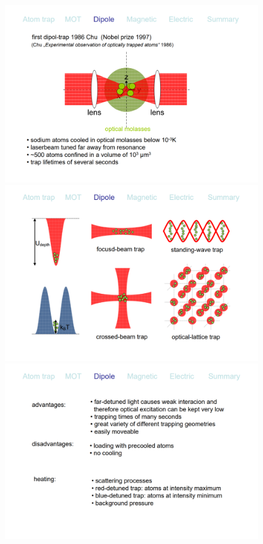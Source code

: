 \documentclass{book}
\theoremstyle{definition}
\begin{document}
\begin{itemize}
\begin{itemize}
\begin{figure}[!htb]
		\includegraphics[scale=0.3]{slide4}
		\includegraphics[scale=0.3]{slide5}
		\includegraphics[scale=0.3]{slide6}
	\end{figure}
		
	\end{itemize}





\end{itemize}
\end{document}
